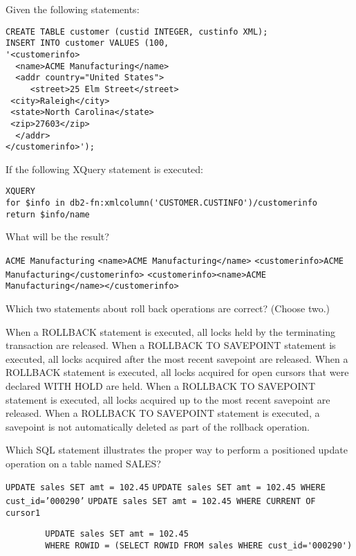 \documentclass[11pt]{exam}
\begin{document}
\begin{questions}
\question[1]
Given the following statements:
\begin{verbatim}
CREATE TABLE customer (custid INTEGER, custinfo XML);
INSERT INTO customer VALUES (100,
'<customerinfo>
  <name>ACME Manufacturing</name>
  <addr country="United States">
     <street>25 Elm Street</street>
 <city>Raleigh</city>
 <state>North Carolina</state>
 <zip>27603</zip>
  </addr>
</customerinfo>');
\end{verbatim}
If the following XQuery statement is executed:
\begin{verbatim}
XQUERY
for $info in db2-fn:xmlcolumn('CUSTOMER.CUSTINFO')/customerinfo
return $info/name
\end{verbatim}
What will be the result?
\begin{choices}
\choice \texttt{ACME Manufacturing}
\choice \texttt{<name>ACME Manufacturing</name>}
\choice \texttt{<customerinfo>ACME Manufacturing</customerinfo>}
\choice \texttt{<customerinfo><name>ACME Manufacturing</name></customerinfo>}
\end{choices}

\question[1]
Which two statements about roll back operations are correct? (Choose two.)
\begin{choices}
\choice When a ROLLBACK statement is executed, all locks held by the terminating transaction are released.
\choice When a ROLLBACK TO SAVEPOINT statement is executed, all locks acquired after the most recent
savepoint are released.
\choice When a ROLLBACK statement is executed, all locks acquired for open cursors that were 
declared WITH HOLD are held.
\choice When a ROLLBACK TO SAVEPOINT statement is executed, all locks acquired up to the most recent
savepoint are released.
\choice When a ROLLBACK TO SAVEPOINT statement is executed, a savepoint is not automatically deleted as
part of the rollback operation.
\end{choices}

\question[1]
Which SQL statement illustrates the proper way to perform a positioned update operation on a table named
SALES?
\begin{choices}
\choice \texttt{UPDATE sales SET amt = 102.45}
\choice \texttt{UPDATE sales SET amt = 102.45 WHERE cust\_id='000290'}
\choice \texttt{UPDATE sales SET amt = 102.45 WHERE CURRENT OF cursor1}
\choice \begin{verbatim}
		UPDATE sales SET amt = 102.45
		WHERE ROWID = (SELECT ROWID FROM sales WHERE cust_id='000290')
		\end{verbatim}
\end{choices}


\end{questions}
\end{document}
